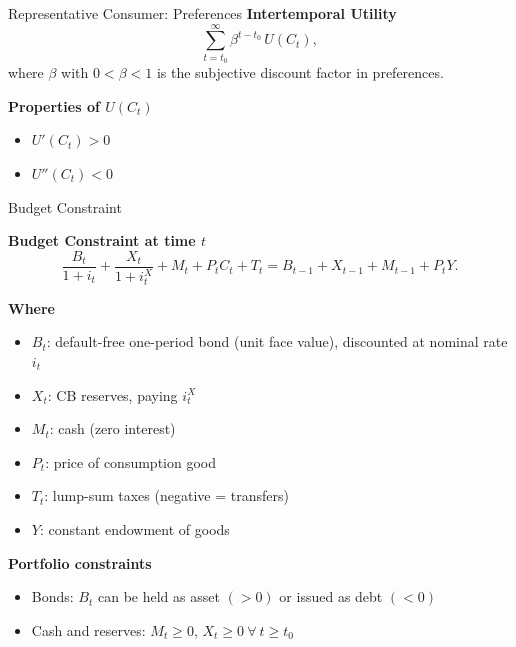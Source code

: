 \documentclass[11pt,aspectratio=169]{beamer}
\begin{document}
\begin{frame}{Representative Consumer: Preferences}
\textbf{Intertemporal Utility}
\begin{equation}
\sum_{t=t_0}^{\infty} \beta^{t-t_0} \, U(C_t), 
\label{eq: utility}
\end{equation}
where $\beta$ with $0<\beta<1$ is the subjective discount factor in preferences.

\vspace{0.5cm}
\textbf{Properties of $U(C_t)$}
\begin{itemize}
  \item $U'(C_t) > 0$
  \item $U''(C_t) < 0$
\end{itemize}
\end{frame}

\begin{frame}[label=orig_budget]{Budget Constraint}

\textbf{Budget Constraint at time $t$}
\begin{equation}
\frac{B_t}{1+i_t} + \frac{X_t}{1+i_t^X} + M_t + P_t C_t + T_t
= B_{t-1} + X_{t-1} + M_{t-1} + P_t Y.
\label{eq: budget}
\end{equation}

\textbf{Where}
\begin{itemize}
  \item $B_t$: default-free one-period bond (unit face value), discounted at nominal rate $i_t$
  \item $X_t$: CB reserves, paying $i_t^X$
  \item $M_t$: cash (zero interest)
  \item $P_t$: price of consumption good
  \item $T_t$: lump-sum taxes (negative = transfers)
  \item $Y$: constant endowment of goods
\end{itemize}

\textbf{Portfolio constraints}
\begin{itemize}
  \item Bonds: $B_t$ can be held as asset $(>0)$ or issued as debt $(<0)$
  \item Cash and reserves: $M_t \ge 0$, $X_t \ge 0 \ \forall \ t \ge t_0$
\end{itemize}
\end{frame}
\end{document}
